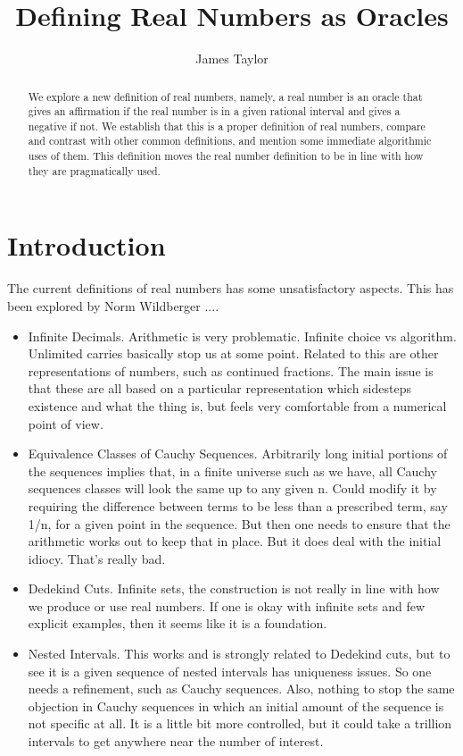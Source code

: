 \documentclass[12pt]{article}
\title{Defining Real Numbers as Oracles}
\author{
  James Taylor
}
\theoremstyle{remark}
\begin{document}
\maketitle
\begin{abstract}
We explore a new definition of real numbers, namely, a real number is an oracle that gives an affirmation if the real number is in a given rational interval and gives a negative if not. We establish that this is a proper definition of real numbers, compare and contrast with other common definitions, and mention some immediate algorithmic uses of them. This definition moves the real number definition to be in line with how they are pragmatically used. 
\end{abstract}





\section{Introduction}


The current definitions of real numbers has some unsatisfactory aspects. This
has been explored by Norm Wildberger ....

\begin{itemize}
    \item Infinite Decimals. Arithmetic is very problematic. Infinite choice vs
  algorithm. Unlimited carries basically stop us at some point. Related to
  this are other representations of numbers, such as continued fractions. The
  main issue is that these are all based on a particular representation which
  sidesteps existence and what the thing is, but feels very comfortable from a
  numerical point of view. 
  \item Equivalence Classes of Cauchy Sequences. Arbitrarily long initial portions
  of the sequences implies that, in a finite universe such as we have, all
  Cauchy sequences classes will look the same up to any given n. Could modify
  it by requiring the difference between terms to be less than a prescribed
  term, say 1/n, for a given point in the sequence. But then one needs to
  ensure that the arithmetic works out to keep that in place. But it does deal
  with the initial idiocy. That's really bad. 
  \item Dedekind Cuts. Infinite sets, the construction is not really in line with
  how we produce or use real numbers. If one is okay with infinite sets and
  few explicit examples, then it seems like it is a foundation. 
  \item Nested Intervals. This works and is strongly related to Dedekind cuts, but
  to see it is a given sequence of nested intervals has uniqueness issues. So
  one needs a refinement, such as Cauchy sequences. Also, nothing to stop the
  same objection in Cauchy sequences in which an initial amount of the
  sequence is not specific at all. It is a little bit more controlled, but it
  could take a trillion intervals to get anywhere near the number of interest.
\end{itemize}
\end{document}
